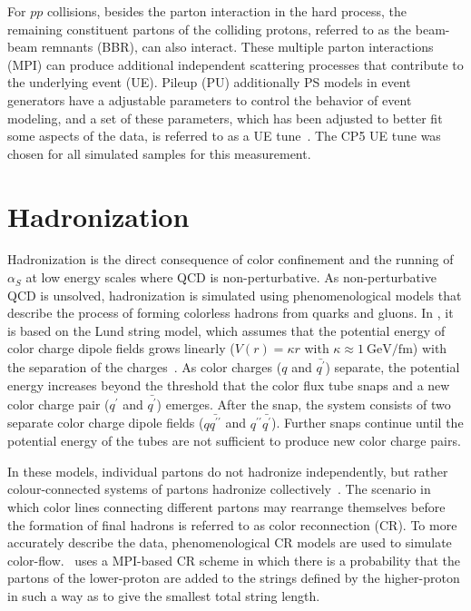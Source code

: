 For $pp$ collisions, besides the parton interaction in the hard process, the remaining constituent partons of the colliding protons, referred to as the beam-beam remnants (BBR), can also interact.
These multiple parton interactions (MPI) can produce additional independent scattering processes that contribute to the underlying event (UE).
Pileup (PU) additionally 
PS models in event generators have a adjustable parameters to control the behavior of event modeling, and a set of these parameters, which has been adjusted to better fit some aspects of the data, is referred to as a UE tune~\cite{Sirunyan:2669320}.
The CP5 UE tune was chosen for all simulated samples for this measurement.

\section{Hadronization}
Hadronization is the direct consequence of color confinement and the running of $\alpha_S$ at low energy scales where QCD is non-perturbative.
As non-perturbative QCD is unsolved, hadronization is simulated using phenomenological models that describe the process of forming colorless hadrons from quarks and gluons.
In \Pythia, it is based on the Lund string model, which assumes that the potential energy of color charge dipole fields grows linearly ($V(r) = \kappa r$ with $\kappa \approx \SI{1}{\GeV \per \femto \m}$) with the separation of the charges~\cite{SJOSTRAND2015159}.
As color charges ($q$ and $\bar{q^\prime}$) separate, the potential energy increases beyond the threshold that the color flux tube snaps and a new color charge pair ($q^\prime$ and $\bar{q^\prime}$) emerges.
After the snap, the system consists of two separate color charge dipole fields ($q\bar{q^{\prime\prime}}$ and $q^{\prime\prime}\bar{q^\prime}$).
Further snaps continue until the potential energy of the tubes are not sufficient to produce new color charge pairs.

In these models, individual partons do not hadronize independently, but rather colour-connected systems of partons hadronize collectively~\cite{BUCKLEY2011145}.
The scenario in which color lines connecting different partons may rearrange themselves before the formation of final hadrons is referred to as color reconnection (CR).
To more accurately describe the data, phenomenological CR models are used to simulate color-flow.
\Pythia\ uses a MPI-based CR scheme in which there is a probability that the partons of the lower-\pT proton are added to the strings defined by the higher-\pT proton in such a way as to give the smallest total string length.

